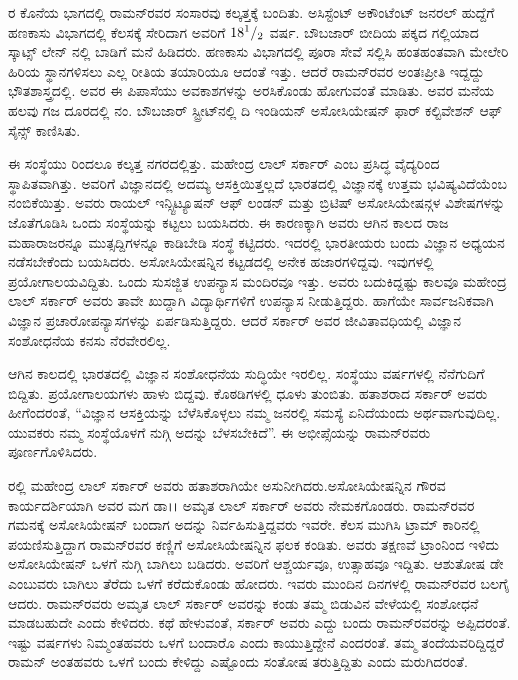 ರ ಕೊನೆಯ ಭಾಗದಲ್ಲಿ ರಾಮನ್‍ರವರ ಸಂಸಾರವು ಕಲ್ಕತ್ತಕ್ಕೆ ಬಂದಿತು. ಅಸಿಸ್ಟೆಂಟ್ ಅಕೌಂಟೆಂಟ್ ಜನರಲ್ ಹುದ್ದೆಗೆ ಹಣಕಾಸು ವಿಭಾಗದಲ್ಲಿ ಕೆಲಸಕ್ಕೆ ಸೇರಿದಾಗ ಅವರಿಗೆ ${\rm 18}^1/_2$ ವರ್ಷ. ಬೌಬಜಾರ್ ಬೀದಿಯ ಪಕ್ಕದ ಗಲ್ಲಿಯಾದ ಸ್ಕಾಟ್ಸ್ ‍ಲೇನ್ ನಲ್ಲಿ ಬಾಡಿಗೆ ಮನೆ ಹಿಡಿದರು. ಹಣಕಾಸು ವಿಭಾಗದಲ್ಲಿ ಪೂರಾ ಸೇವೆ ಸಲ್ಲಿಸಿ ಹಂತಹಂತವಾಗಿ ಮೇಲೇರಿ ಹಿರಿಯ ಸ್ಥಾನಗಳಿಸಲು ಎಲ್ಲ ರೀತಿಯ ತಯಾರಿಯೂ ಆದಂತೆ ಇತ್ತು. ಆದರೆ ರಾಮನ್‍ರವರ ಅಂತಃಪ್ರೀತಿ ಇದ್ದದ್ದು ಭೌತಶಾಸ್ತ್ರದಲ್ಲಿ. ಅವರ ಈ ಪಿಪಾಸೆಯು ಅವಕಾಶಗಳನ್ನು ಅರಸಿಕೊಂಡು ಹೋಗುವಂತೆ ಮಾಡಿತು. ಅವರ ಮನೆಯ ಹಲವು ಗಜ ದೂರದಲ್ಲಿ ನಂ. ಬೌಬಜಾರ್ ಸ್ಟ್ರೀಟ್‍ನಲ್ಲಿ ದಿ ಇಂಡಿಯನ್ ಅಸೋಸಿಯೇಷನ್ ಫಾರ್ ಕಲ್ಟಿವೇಶನ್ ಆಫ್ ಸೈನ್ಸ್ ಕಾಣಿಸಿತು.



ಈ ಸಂಸ್ಥೆಯು  ರಿಂದಲೂ ಕಲ್ಕತ್ತ ನಗರದಲ್ಲಿತ್ತು. ಮಹೇಂದ್ರ ಲಾಲ್ ಸರ್ಕಾರ್ ಎಂಬ ಪ್ರಸಿದ್ಧ ವೈದ್ಯರಿಂದ ಸ್ಥಾಪಿತವಾಗಿತ್ತು. ಅವರಿಗೆ ವಿಜ್ಞಾನದಲ್ಲಿ ಅದಮ್ಯ ಆಸಕ್ತಿಯಿತ್ತಲ್ಲದೆ ಭಾರತದಲ್ಲಿ ವಿಜ್ಞಾನಕ್ಕೆ ಉತ್ತಮ ಭವಿಷ್ಯವಿದೆಯೆಂಬ ನಂಬಿಕೆಯಿತ್ತು. ಅವರು ರಾಯಲ್ ಇನ್ಸ್ಟಿಟ್ಯೂಷನ್ ಆಫ್ ಲಂಡನ್ ಮತ್ತು ಬ್ರಿಟಿಷ್ ಅಸೋಸಿಯೇಷನ್ಗಳ ವಿಶೇಷಗಳನ್ನು ಜೊತೆಗೂಡಿಸಿ ಒಂದು ಸಂಸ್ಥೆಯನ್ನು ಕಟ್ಟಲು ಬಯಸಿದರು. ಈ ಕಾರಣಕ್ಕಾಗಿ ಅವರು ಆಗಿನ ಕಾಲದ ರಾಜ ಮಹಾರಾಜರನ್ನೂ ಮುತ್ಸದ್ದಿಗಳನ್ನೂ ಕಾಡಿಬೇಡಿ ಸಂಸ್ಥೆ ಕಟ್ಟಿದರು. ಇದರಲ್ಲಿ ಭಾರತೀಯರು ಬಂದು ವಿಜ್ಞಾನ ಅಧ್ಯಯನ ನಡೆಸಬೇಕೆಂದು ಬಯಸಿದರು. ಅಸೋಸಿಯೇಷನ್ನಿನ ಕಟ್ಟಡದಲ್ಲಿ ಅನೇಕ ಹಜಾರಗಳಿದ್ದವು. ಇವುಗಳಲ್ಲಿ ಪ್ರಯೋಗಾಲಯವಿದ್ದಿತು. ಒಂದು ಸುಸಜ್ಜಿತ ಉಪನ್ಯಾಸ ಮಂದಿರವೂ ಇತ್ತು. ಅವರು ಬದುಕಿದ್ದಷ್ಟು ಕಾಲವೂ ಮಹೇಂದ್ರ ಲಾಲ್ ಸರ್ಕಾರ್ ಅವರು ತಾವೇ ಖುದ್ದಾಗಿ ವಿದ್ಯಾರ್ಥಿಗಳಿಗೆ ಉಪನ್ಯಾಸ ನೀಡುತ್ತಿದ್ದರು. ಹಾಗೆಯೇ ಸಾರ್ವಜನಿಕವಾಗಿ ವಿಜ್ಞಾನ ಪ್ರಚಾರೋಪನ್ಯಾಸಗಳನ್ನು ಏರ್ಪಡಿಸುತ್ತಿದ್ದರು. ಆದರೆ ಸರ್ಕಾರ್ ಅವರ ಜೀವಿತಾವಧಿಯಲ್ಲಿ ವಿಜ್ಞಾನ ಸಂಶೋಧನೆಯ ಕನಸು ನೆರವೇರಲಿಲ್ಲ.

ಆಗಿನ ಕಾಲದಲ್ಲಿ ಭಾರತದಲ್ಲಿ ವಿಜ್ಞಾನ ಸಂಶೋಧನೆಯ ಸುದ್ಧಿಯೇ ಇರಲಿಲ್ಲ. ಸಂಸ್ಥೆಯು  ವರ್ಷಗಳಲ್ಲಿ ನೆನೆಗುದಿಗೆ ಬಿದ್ದಿತು. ಪ್ರಯೋಗಾಲಯಗಳು ಹಾಳು ಬಿದ್ದವು. ಕೊಠಡಿಗಳಲ್ಲಿ ಧೂಳು ತುಂಬಿತು. ಹತಾಶರಾದ ಸರ್ಕಾರ್ ಅವರು ಹೀಗೆಂದರಂತೆ, “ವಿಜ್ಞಾನ ಆಸಕ್ತಿಯನ್ನು ಬೆಳೆಸಿಕೊಳ್ಳಲು ನಮ್ಮ ಜನರಲ್ಲಿ ಸಮಸ್ಯೆ ಏನಿದೆಯಂದು ಅರ್ಥವಾಗುವುದಿಲ್ಲ. ಯುವಕರು ನಮ್ಮ ಸಂಸ್ಥೆಯೊಳಗೆ ನುಗ್ಗಿ ಅದನ್ನು ಬೆಳಸಬೇಕಿದೆ”. ಈ ಅಭೀಪ್ಸೆಯನ್ನು ರಾಮನ್‍ರವರು ಪೂರ್ಣಗೊಳಿಸಿದರು.

ರಲ್ಲಿ ಮಹೇಂದ್ರ ಲಾಲ್ ಸರ್ಕಾರ್ ಅವರು ಹತಾಶರಾಗಿಯೇ ಅಸುನೀಗಿದರು.\break ಅಸೋಸಿಯೇಷನ್ನಿನ ಗೌರವ ಕಾರ್ಯದರ್ಶಿಯಾಗಿ ಅವರ ಮಗ ಡಾ।। ಅಮೃತ ಲಾಲ್ ಸರ್ಕಾರ್ ಅವರು ನೇಮಕಗೊಂಡರು. ರಾಮನ್‍ರವರ ಗಮನಕ್ಕೆ ಅಸೋಸಿಯೇಷನ್ ಬಂದಾಗ ಅದನ್ನು ನಿರ್ವಹಿಸುತ್ತಿದ್ದವರು ಇವರೇ. ಕೆಲಸ ಮುಗಿಸಿ ಟ್ರಾಮ್ ಕಾರಿನಲ್ಲಿ ಪಯಣಿಸುತ್ತಿದ್ದಾಗ ರಾಮನ್‍ರವರ ಕಣ್ಣಿಗೆ ಅಸೋಸಿಯೇಷನ್ನಿನ ಫಲಕ ಕಂಡಿತು. ಅವರು ತಕ್ಷಣವೆ ಟ್ರಾಂನಿಂದ ಇಳಿದು ಅಸೋಸಿಯೇಷನ್ ಒಳಗೆ ನುಗ್ಗಿ ಬಾಗಿಲು ಬಡಿದರು. ಅವರಿಗೆ ಆಶ್ಚರ್ಯವೂ, ಉತ್ಸಾಹವೂ ಇದ್ದಿತು. ಆಶುತೋಷ ಡೇ ಎಂಬುವರು ಬಾಗಿಲು ತೆರೆದು ಒಳಗೆ ಕರೆದುಕೊಂಡು ಹೋದರು. ಇವರು ಮುಂದಿನ ದಿನಗಳಲ್ಲಿ ರಾಮನ್‍ರವರ ಬಲಗೈ ಆದರು. ರಾಮನ್‍ರವರು ಅಮೃತ ಲಾಲ್ ಸರ್ಕಾರ್ ಅವರನ್ನು ಕಂಡು ತಮ್ಮ ಬಿಡುವಿನ ವೇಳೆಯಲ್ಲಿ ಸಂಶೋಧನೆ ಮಾಡಬಹುದೇ ಎಂದು ಕೇಳಿದರು. ಕಥೆ ಹೇಳುವಂತೆ, ಸರ್ಕಾರ್ ಅವರು ಎದ್ದು ಬಂದು ರಾಮನ್‍ರವರನ್ನು ಅಪ್ಪಿದರಂತೆ. ಇಷ್ಟು ವರ್ಷಗಳು ನಿಮ್ಮಂತಹವರು ಒಳಗೆ ಬಂದಾರೊ ಎಂದು ಕಾಯುತ್ತಿದ್ದೇನೆ ಎಂದರಂತೆ. ತಮ್ಮ ತಂದೆಯವರಿದ್ದಿದ್ದರೆ ರಾಮನ್ ಅಂತಹವರು ಒಳಗೆ ಬಂದು ಕೇಳಿದ್ದು ಎಷ್ಟೊಂದು ಸಂತೋಷ ತರುತ್ತಿದ್ದಿತು ಎಂದು ಮರುಗಿದರಂತೆ.

